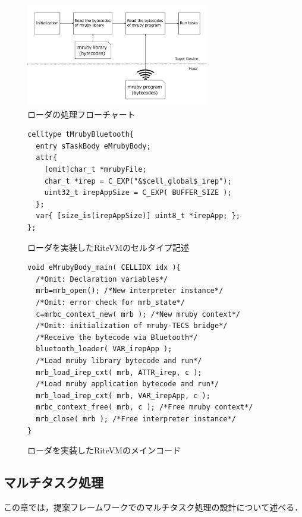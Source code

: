 \documentclass[submit,techrep]{ipsj}
\begin{document}
\begin{figure}[t]
    \centering
    \includegraphics[width=8cm,clip]{../EMSOFT2016/figure/control_flow.pdf}
    \caption{ローダの処理フローチャート}
    \label{fig:control_flow}
\end{figure}
\begin{figure}[t]
\centering
\begin{lstlisting}
celltype tMrubyBluetooth{
  entry sTaskBody eMrubyBody;
  attr{
    [omit]char_t *mrubyFile;
    char_t *irep = C_EXP("&$cell_global$_irep");
    uint32_t irepAppSize = C_EXP( BUFFER_SIZE );
  };
  var{ [size_is(irepAppSize)] uint8_t *irepApp; };
};
\end{lstlisting}
\caption{ローダを実装したRiteVMのセルタイプ記述}
\label{celltype_mrubybluetooth}
\end{figure}
\begin{figure}[t]
\centering
\begin{lstlisting}
void eMrubyBody_main( CELLIDX idx ){
  /*Omit: Declaration variables*/
  mrb=mrb_open(); /*New interpreter instance*/
  /*Omit: error check for mrb_state*/
  c=mrbc_context_new( mrb ); /*New mruby context*/
  /*Omit: initialization of mruby-TECS bridge*/
  /*Receive the bytecode via Bluetooth*/
  bluetooth_loader( VAR_irepApp );
  /*Load mruby library bytecode and run*/
  mrb_load_irep_cxt( mrb, ATTR_irep, c );
  /*Load mruby application bytecode and run*/
  mrb_load_irep_cxt( mrb, VAR_irepApp, c );
  mrbc_context_free( mrb, c ); /*Free mruby context*/
  mrb_close( mrb ); /*Free interpreter instance*/
}

\end{lstlisting}
\caption{ローダを実装したRiteVMのメインコード}
\label{maincode_mrubybluetooth}
\end{figure}
\subsection{マルチタスク処理}
\label{sec:Multitask}
この章では，提案フレームワークでのマルチタスク処理の設計について述べる．
\end{document}
